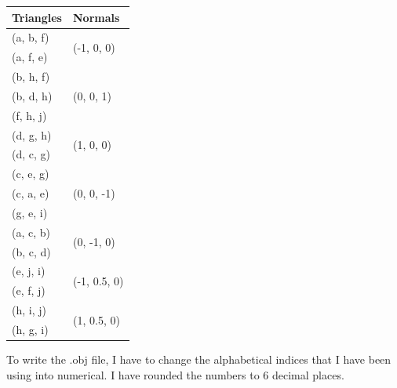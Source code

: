 \documentclass[10pt]{report}
\begin{document}
\begin{table}
    \begin{tabular}{|l|l|} 
    \hline
    \textbf{ Triangles } & \textbf{Normals }              \\ 
    \hline
    (a, b, f)            & \multirow{2}{*}{(-1, 0, 0)}    \\
    (a, f, e)            &                                \\ 
    \hline
    (b, h, f)            & \multirow{3}{*}{(0, 0, 1)}     \\
    (b, d, h)            &                                \\
    (f, h, j)            &                                \\ 
    \hline
    (d, g, h)            & \multirow{2}{*}{(1, 0, 0)}     \\
    (d, c, g)            &                                \\ 
    \hline
    (c, e, g)            & \multirow{3}{*}{(0, 0, -1)}    \\
    (c, a, e)            &                                \\
    (g, e, i)            &                                \\ 
    \hline
    (a, c, b)            & \multirow{2}{*}{(0, -1, 0)}    \\
    (b, c, d)            &                                \\ 
    \hline
    (e, j, i)            & \multirow{2}{*}{(-1, 0.5, 0)}  \\
    (e, f, j)            &                                \\ 
    \hline
    (h, i, j)            & \multirow{2}{*}{(1, 0.5, 0)}   \\
    (h, g, i)            &                                \\
    \hline
    \end{tabular}
\end{table}

\newpage

To write the .obj file, I have to change the alphabetical indices that I have been using into numerical. I have rounded the numbers to 6 decimal places.
\end{document}
